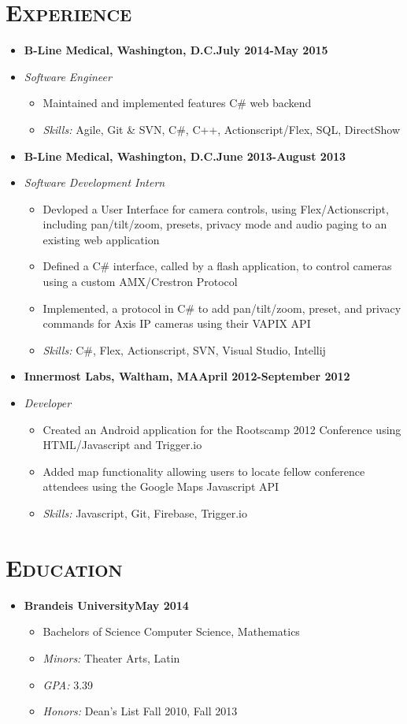 \documentclass[10pt, oneside]{article}
\newcommand{\lr}[2]{#1\hfill#2}
\newcommand{\reseducation}[6]{
  \begin{ressection}{Education}
  \item[] \lr{\bfseries \selectfont #1\normalfont} {#2}
    \vspace{-8pt}
    \begin{itemize} \itemsep-2pt
    \item[] #4
    \item[] \textsl{Minors: }#5
    \item[] \textsl{GPA: }#3
    \item[] \textsl{Honors: }#6
    \end{itemize}
  \end{ressection}
}
\newcommand{\skills}[1]{
\item[] \textsl{Skills:} #1
}
\newenvironment{ressection}[1]{
  \section{\normalsize \scshape \selectfont #1 \normalfont}
  \vspace{-4pt}
  \begin{itemize} \itemsep-2pt
  }{
  \end{itemize}
  \vspace{-20pt}
}
\newenvironment{resitem}[4]{
\item[] \lr{\bfseries \selectfont #1\normalfont, #2} {#3}
\item[] \textsl{#4}
  \vspace{-4pt}
  \begin{itemize} \itemsep-2pt
  }{
  \end{itemize}
}
\begin{document}
\begin{ressection}{Experience}
\begin {resitem}{B-Line Medical}{Washington, D.C.}{July 2014-May 2015}{Software Engineer}
  \item Maintained and implemented features  C\# web backend
    \skills{Agile, Git \& SVN, C\#, C++, Actionscript/Flex, SQL, DirectShow}
  \end{resitem}
  \begin{resitem}{B-Line Medical}{Washington, D.C.}{June 2013-August 2013}{Software Development Intern}
  \item Devloped a User Interface for camera controls, using Flex/Actionscript, including pan/tilt/zoom, presets, privacy mode and audio paging to an existing web application
  \item Defined a C\# interface, called by a flash application, to control cameras using a custom AMX/Crestron Protocol
  \item Implemented, a protocol in C\# to add pan/tilt/zoom, preset, and privacy commands for Axis IP cameras using their VAPIX API
    \skills{C\#, Flex, Actionscript, SVN, Visual Studio, Intellij}
  \end{resitem}
  \begin{resitem}{Innermost Labs}{Waltham, MA}{April 2012-September 2012}{Developer}
  \item Created an Android application for the Rootscamp 2012 Conference using HTML/Javascript and Trigger.io
  \item Added map functionality allowing users to locate fellow conference attendees  using the Google Maps Javascript API
    \skills{Javascript, Git, Firebase, Trigger.io}
  \end{resitem}
\end{ressection}
\reseducation{Brandeis University}{May 2014}{3.39}{Bachelors of Science Computer Science, Mathematics}{Theater Arts, Latin}{Dean's List Fall 2010, Fall 2013}
\end{document}
